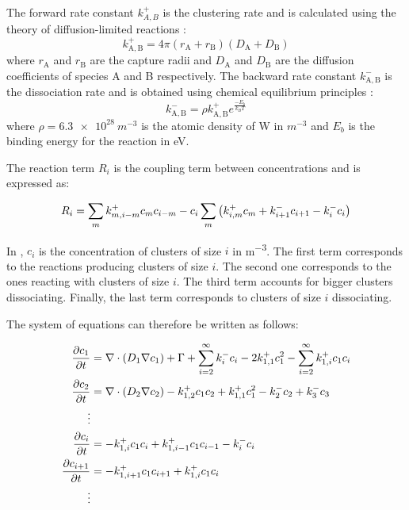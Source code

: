 The forward rate constant $k^+_{A,B}$ is the clustering rate and is calculated using the theory of diffusion-limited reactions :
\begin{equation}
    k^+_\mathrm{A,B} = 4 \pi (r_\mathrm{A} + r_\mathrm{B}) (D_\mathrm{A} + D_\mathrm{B})
\end{equation}
where $r_\mathrm{A}$ and $r_\mathrm{B}$ are the capture radii and $D_\mathrm{A}$ and $D_\mathrm{B}$ are the diffusion coefficients of species A and B respectively.
The backward rate constant $k^-_\mathrm{A,B}$ is the dissociation rate and is obtained using chemical equilibrium principles \cite{goldstein_diffusion_2007}:
\begin{equation}
    k^-_\mathrm{A,B} =\rho k^+_\mathrm{A,B}e^{\frac{-E_b}{k_B T}}
\end{equation}
where $\rho = \SI{6.3e28}{m^{-3}}$ is the atomic density of W in $\si{m^{-3}}$ and $E_b$ is the binding energy for the reaction  in \si{eV}.

The reaction term $R_i$ is the coupling term between concentrations and is expressed as:

\begin{equation}
    R_i=  \sum_{m} k^+_{m,i-m} c_m c_{i-m}  - c_i \sum_m \left( k_{i, m}^+ c_{m} + k_{i+1}^- c_{i+1} -  k_i^- c_i \right)
    \labeq{reaction term}
\end{equation}


In , $c_i$ is the concentration of clusters of size $i$ in \si{m^{-3}}.
The first term corresponds to the reactions producing clusters of size $i$.
The second one corresponds to the ones reacting with clusters of size $i$.
The third term accounts for bigger clusters dissociating.
Finally, the last term corresponds to clusters of size $i$ dissociating.

The system of equations can therefore be written as follows:

\begin{subequations}
    \begin{align}
        \frac{\partial c_1}{\partial t} &= \nabla \cdot (D_1 \nabla c_1) + \Gamma + \sum\limits_{i=2}^\infty k_{i}^- c_i - 2k_{1, 1}^+ c_1^2 - \sum\limits_{i=2}^\infty k_{1,i}^+ c_1 c_i \\
        \frac{\partial c_2}{\partial t} &= \nabla \cdot (D_2 \nabla c_2) - k_{1, 2}^+ c_1 c_2 + k_{1, 1}^+ c_1^2 - k_{2}^- c_2 + k_{3}^- c_3\\
        \vdots \nonumber\\
        \frac{\partial c_i}{\partial t} &= - k_{1, i}^+ c_1 c_i + k_{1, i-1}^+ c_1 c_{i-1} - k_{i}^- c_i\\
        \frac{\partial c_{i+1}}{\partial t} &= - k_{1, i+1}^+ c_1 c_{i+1} + k_{1, i}^+ c_1 c_i\\
        \vdots \nonumber
    \end{align}
    \labeq{temporal evolution no grouping}
\end{subequations}

